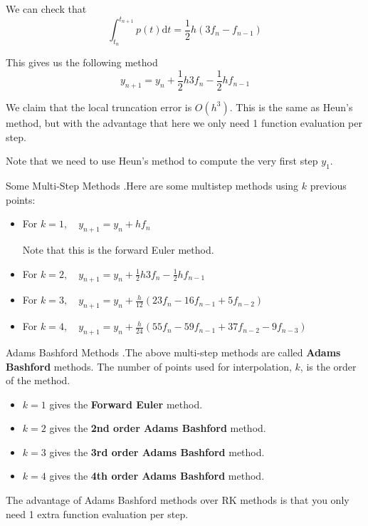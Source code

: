 \documentclass[12pt,letterpaper]{article}
\newcommand{\dd}{\mathrm{d}}
\begin{document}
We can check that
\begin{equation}
	\int_{t_n}^{t_{n+1}} p(t) \dd t = \frac{1}{2}h (3f_n - f_{n-1})
\end{equation}

This gives us the following method
\begin{equation}
	y_{n+1} = y_n + \frac{1}{2}h 3f_n - \frac{1}{2} h f_{n-1}
\end{equation}

We claim that the local truncation error is $O(h^3)$. This is the same as Heun's method, but with the advantage that here we only need 1 function evaluation per step.

Note that we need to use Heun's method to compute the very first step $y_1$.

\begin{algo}{Some Multi-Step Methods}
.Here are some multistep methods using $k$ previous points:

\begin{itemize}
	\item For $k=1, \quad y_{n+1} = y_n + hf_n$
	
	Note that this is the forward Euler method.
	\item For $k=2, \quad y_{n+1} = y_n + \frac{1}{2} h 3f_n - \frac{1}{2}hf_{n-1}$
	\item For $k=3, \quad y_{n+1} = y_n + \frac{h}{12}(23 f_n - 16 f_{n-1} + 5 f_{n-2})$
	\item For $k=4, \quad y_{n+1} = y_n + \frac{h}{24}(55f_n - 59f_{n-1} + 37f_{n-2} - 9f_{n-3})$
\end{itemize}
\end{algo}

\begin{defn}{Adams Bashford Methods}
.The above multi-step methods are called \textbf{Adams Bashford} methods. The number of points used for interpolation, $k$, is the order of the method.

\begin{itemize}
	\item $k=1$ gives the \textbf{Forward Euler} method.
	\item $k=2$ gives the \textbf{2nd order Adams Bashford} method.
	\item $k=3$ gives the \textbf{3rd order Adams Bashford} method.
	\item $k=4$ gives the \textbf{4th order Adams Bashford} method.
\end{itemize}

The advantage of Adams Bashford methods over RK methods is that you only need 1 extra function evaluation per step.
\end{defn}
\end{document}
